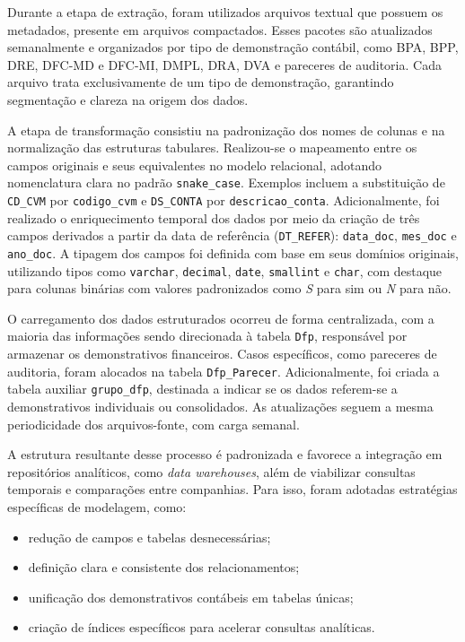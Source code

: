 Durante a etapa de extração, foram utilizados arquivos textual que possuem os metadados, presente em arquivos compactados. Esses pacotes são atualizados semanalmente e organizados por tipo de demonstração contábil, como BPA, BPP, DRE, DFC-MD e DFC-MI, DMPL, DRA, DVA e pareceres de auditoria. Cada arquivo trata exclusivamente de um tipo de demonstração, garantindo segmentação e clareza na origem dos dados.

A etapa de transformação consistiu na padronização dos nomes de colunas e na normalização das estruturas tabulares. Realizou-se o mapeamento entre os campos originais e seus equivalentes no modelo relacional, adotando nomenclatura clara no padrão \texttt{snake\_case}. Exemplos incluem a substituição de \texttt{CD\_CVM} por \texttt{codigo\_cvm} e \texttt{DS\_CONTA} por \texttt{descricao\_conta}. Adicionalmente, foi realizado o enriquecimento temporal dos dados por meio da criação de três campos derivados a partir da data de referência (\texttt{DT\_REFER}): \texttt{data\_doc}, \texttt{mes\_doc} e \texttt{ano\_doc}. A tipagem dos campos foi definida com base em seus domínios originais, utilizando tipos como \texttt{varchar}, \texttt{decimal}, \texttt{date}, \texttt{smallint} e \texttt{char}, com destaque para colunas binárias com valores padronizados como \textit{S} para sim ou \textit{N} para não.

O carregamento dos dados estruturados ocorreu de forma centralizada, com a maioria das informações sendo direcionada à tabela \texttt{Dfp}, responsável por armazenar os demonstrativos financeiros. Casos específicos, como pareceres de auditoria, foram alocados na tabela \texttt{Dfp\_Parecer}. Adicionalmente, foi criada a tabela auxiliar \texttt{grupo\_dfp}, destinada a indicar se os dados referem-se a demonstrativos individuais ou consolidados. As atualizações seguem a mesma periodicidade dos arquivos-fonte, com carga semanal.

A estrutura resultante desse processo é padronizada e favorece a integração em repositórios analíticos, como \textit{data warehouses}, além de viabilizar consultas temporais e comparações entre companhias. Para isso, foram adotadas estratégias específicas de modelagem, como: 

\begin{itemize}
	\item redução de campos e tabelas desnecessárias;
	\item definição clara e consistente dos relacionamentos;
	\item unificação dos demonstrativos contábeis em tabelas únicas;
	\item criação de índices específicos para acelerar consultas analíticas.
\end{itemize}


